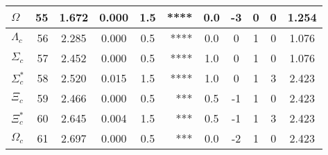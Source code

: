 \documentclass[a4paper,10pt]{article}
\begin{document}
\begin{tabular}{|lr|cccrccccc|}
$\Omega        $ &  55&  1.672&  0.000 &  1.5 &  ****&      0.0&      -3&       0&       0& 1.254\\
\hline
$\Lambda_c     $ &  56&  2.285&  0.000 &  0.5 &  ****&      0.0&       0&       1&       0& 1.076\\
$\Sigma_c      $ &  57&  2.452&  0.000 &  0.5 &  ****&      1.0&       0&       1&       0& 1.076\\
$\Sigma_c^*    $ &  58&  2.520&  0.015 &  1.5 &  ****&      1.0&       0&       1&       3& 2.423\\
$\Xi_c         $ &  59&  2.466&  0.000 &  0.5 &   ***&      0.5&      -1&       1&       0& 2.423\\
$\Xi_c^*       $ &  60&  2.645&  0.004 &  1.5 &   ***&      0.5&      -1&       1&       3& 2.423\\
$\Omega_c      $ &  61&  2.697&  0.000 &  0.5 &   ***&      0.0&      -2&       1&       0& 2.423\\
\hline
\end{tabular}
\end{document}
